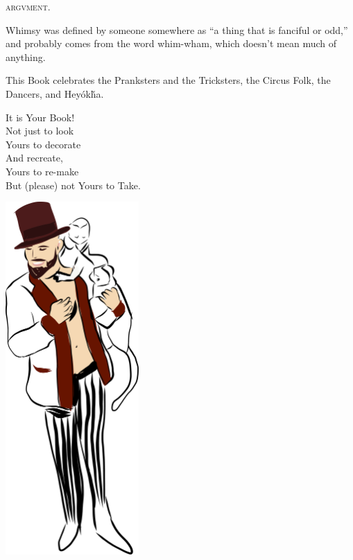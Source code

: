\begin{center}
\booktitlefont\textsc{argvment.}
\end{center}
\begin{center}
\parbox{4.67in}{%
\begin{bookcomment}
Whimsy was defined by someone somewhere as ``a thing that is fanciful or odd,'' and probably comes from the word whim-wham, which doesn't mean much of anything.

This Book celebrates the Pranksters and the Tricksters, the Circus Folk, the Dancers, and Hey\'ok\v{h}a.\\

\bigskip
\begin{center}
It is Your Book!\\
Not just to look\\
Yours to decorate\\
And recreate,\\
Yours to re-make\\
But (please) not Yours to Take.
\end{center}
\end{bookcomment}
}
\end{center}
\includegraphics[width=2in]{images/monkey_circus.pdf}
